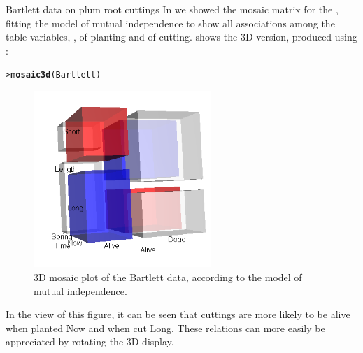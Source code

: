 \documentclass[10pt,krantz2]{krantz}\usepackage[]{graphicx}\usepackage[]{color}
\makeatletter
\newcommand{\hlstd}[1]{\textcolor[rgb]{0.345,0.345,0.345}{#1}}%
\newcommand{\hlkwd}[1]{\textcolor[rgb]{0.737,0.353,0.396}{\textbf{#1}}}%
\newenvironment{kframe}{%
 \def\at@end@of@kframe{}%
 \ifinner\ifhmode%
  \def\at@end@of@kframe{\end{minipage}}%
  \begin{minipage}{\columnwidth}%
 \fi\fi%
 \def\FrameCommand##1{\hskip\@totalleftmargin \hskip-\fboxsep
 \colorbox{shadecolor}{##1}\hskip-\fboxsep
     \hskip-\linewidth \hskip-\@totalleftmargin \hskip\columnwidth}%
 \MakeFramed {\advance\hsize-\width
   \@totalleftmargin\z@ \linewidth\hsize
   \@setminipage}}%
 {\par\unskip\endMakeFramed%
 \at@end@of@kframe}
\newenvironment{knitrout}{}{} %
\renewenvironment{knitrout}{\small\renewcommand{\baselinestretch}{.85}}{} %
\makeatother
\begin{document}
\begin{Example}[bartlett-3d]{Bartlett data on plum root cuttings}
In  we showed the mosaic matrix for the
, fitting the model of mutual independence
to show all associations among the table variables,
,  of planting and  of cutting.
 shows the 3D version, produced using
:
\begin{knitrout}
\color{fgcolor}\begin{kframe}
\begin{alltt}
\hlstd{> }\hlkwd{mosaic3d}\hlstd{(Bartlett)}
\end{alltt}
\end{kframe}
\end{knitrout}

\begin{figure}[!htb]
 \centering
 \includegraphics[width=0.6\textwidth]{ch05/fig/mos3d-bartlett.png}
 \caption{3D mosaic plot of the Bartlett data, according to the model of mutual independence.}\label{fig:mos3d-bartlett}
\end{figure}

In the view of this figure, it can be seen that cuttings are more likely to be alive
when planted Now and when cut Long. These relations can more easily be
appreciated by rotating the 3D display.
\end{Example}

\end{document}
